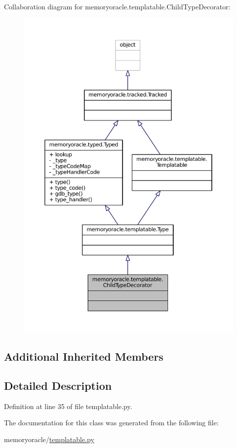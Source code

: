 Collaboration diagram for memoryoracle.\+templatable.\+Child\+Type\+Decorator\+:\nopagebreak
\begin{figure}[H]
\begin{center}
\leavevmode
\includegraphics[width=350pt]{classmemoryoracle_1_1templatable_1_1ChildTypeDecorator__coll__graph}
\end{center}
\end{figure}
\subsection*{Additional Inherited Members}


\subsection{Detailed Description}


Definition at line 35 of file templatable.\+py.



The documentation for this class was generated from the following file\+:\begin{DoxyCompactItemize}
\item 
memoryoracle/\hyperlink{templatable_8py}{templatable.\+py}\end{DoxyCompactItemize}

